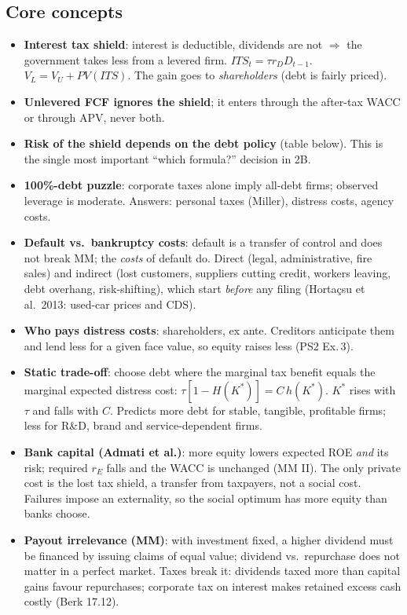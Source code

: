 \documentclass[10pt,a4paper]{article}
\newcommand{\blk}[1]{\subsection*{\color{hd}#1}}
\begin{document}
\blk{Core concepts}
\begin{itemize}
  \item \textbf{Interest tax shield}: interest is deductible, dividends are not $\Rightarrow$ the
        government takes less from a levered firm. $ITS_t=\tau r_D D_{t-1}$.
        $V_L=V_U+PV(ITS)$. The gain goes to \emph{shareholders} (debt is fairly priced).
  \item \textbf{Unlevered FCF ignores the shield}; it enters through the after-tax WACC or through
        APV, never both.
  \item \textbf{Risk of the shield depends on the debt policy} (table below). This is the single most
        important ``which formula?'' decision in 2B.
  \item \textbf{100\%-debt puzzle}: corporate taxes alone imply all-debt firms; observed leverage is
        moderate. Answers: personal taxes (Miller), distress costs, agency costs.
  \item \textbf{Default vs.\ bankruptcy costs}: default is a transfer of control and does not break MM;
        the \emph{costs} of default do. Direct (legal, administrative, fire sales) and indirect (lost
        customers, suppliers cutting credit, workers leaving, debt overhang, risk-shifting), which
        start \emph{before} any filing (Hortaçsu et al.\ 2013: used-car prices and CDS).
  \item \textbf{Who pays distress costs}: shareholders, ex ante. Creditors anticipate them and lend
        less for a given face value, so equity raises less (PS2 Ex.\,3).
  \item \textbf{Static trade-off}: choose debt where the marginal tax benefit equals the marginal
        expected distress cost: $\tau[1-H(K^*)]=C\,h(K^*)$. $K^*$ rises with $\tau$ and falls with $C$.
        Predicts more debt for stable, tangible, profitable firms; less for R\&D, brand and
        service-dependent firms.
  \item \textbf{Bank capital (Admati et al.)}: more equity lowers expected ROE \emph{and} its risk;
        required $r_E$ falls and the WACC is unchanged (MM II). The only private cost is the lost tax
        shield, a transfer from taxpayers, not a social cost. Failures impose an externality, so the
        social optimum has more equity than banks choose.
  \item \textbf{Payout irrelevance (MM)}: with investment fixed, a higher dividend must be financed by
        issuing claims of equal value; dividend vs.\ repurchase does not matter in a perfect market.
        Taxes break it: dividends taxed more than capital gains favour repurchases; corporate tax on
        interest makes retained excess cash costly (Berk 17.12).
\end{itemize}
\end{document}
